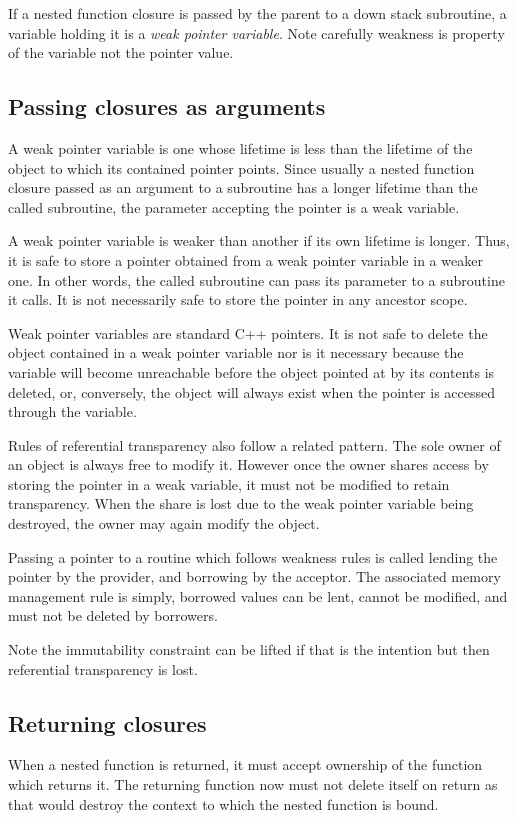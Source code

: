 \documentclass[oneside]{book}
\begin{document}
If a nested function closure is passed by the parent
to a down stack subroutine, a variable holding it is a
{\em weak pointer variable}. Note carefully weakness is property
of the variable not the pointer value.

\subsection{Passing closures as arguments}
A weak pointer variable is one whose lifetime is less than the
lifetime of the object to which its contained pointer points.
Since usually a nested function closure passed as an argument to
a subroutine has a longer lifetime than the called subroutine,
the parameter accepting the pointer is a weak variable.

A weak pointer variable is weaker than another if its own
lifetime is longer. Thus, it is safe to store a pointer obtained
from a weak pointer variable in a weaker one. In other words,
the called subroutine can pass its parameter to a subroutine it
calls. It is not necessarily safe to store the pointer in any
ancestor scope.

Weak pointer variables are standard C++ pointers. It is not
safe to delete the object contained in a weak pointer variable
nor is it necessary because the variable will become unreachable
before the object pointed at by its contents is deleted, or,
conversely, the object will always exist when the pointer is
accessed through the variable.

Rules of referential transparency also follow a related pattern.
The sole owner of an object is always free to modify it. However
once the owner shares access by storing the pointer in a weak
variable, it must not be modified to retain transparency.
When the share is lost due to the weak pointer variable being
destroyed, the owner may again modify the object.

Passing a pointer to a routine which follows weakness rules
is called lending the pointer by the provider, and borrowing
by the acceptor. The associated memory management rule is simply,
borrowed values can be lent, cannot be modified, and must not
be deleted by borrowers.

Note the immutability constraint can be lifted if that is the
intention but then referential transparency is lost.

\subsection{Returning closures}
When a nested function is returned, it must accept ownership
of the function which returns it. The returning function
now must not delete itself on return as that would destroy
the context to which the nested function is bound.
\end{document}
